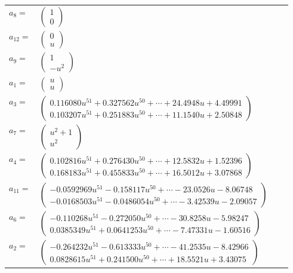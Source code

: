 \documentclass[1p]{elsarticle_modified}
\theoremstyle{definition}
\begin{document}
\begin{tabular}{m{7pt} m{180pt} m{7pt} m{180pt} }
\flushright $a_{8}=$&$\begin{pmatrix}1\\0\end{pmatrix}$ \\
\flushright $a_{12}=$&$\begin{pmatrix}0\\u\end{pmatrix}$ \\
\flushright $a_{9}=$&$\begin{pmatrix}1\\- u^2\end{pmatrix}$ \\
\flushright $a_{1}=$&$\begin{pmatrix}u\\u\end{pmatrix}$ \\
\flushright $a_{3}=$&$\begin{pmatrix}0.116080 u^{51}+0.327562 u^{50}+\cdots+24.4948 u+4.49991\\0.103207 u^{51}+0.251883 u^{50}+\cdots+11.1540 u+2.50848\end{pmatrix}$ \\
\flushright $a_{7}=$&$\begin{pmatrix}u^2+1\\u^2\end{pmatrix}$ \\
\flushright $a_{4}=$&$\begin{pmatrix}0.102816 u^{51}+0.276430 u^{50}+\cdots+12.5832 u+1.52396\\0.168183 u^{51}+0.455833 u^{50}+\cdots+16.5012 u+3.07868\end{pmatrix}$ \\
\flushright $a_{11}=$&$\begin{pmatrix}-0.0592969 u^{51}-0.158117 u^{50}+\cdots-23.0526 u-8.06748\\-0.0168503 u^{51}-0.0486054 u^{50}+\cdots-3.42539 u-2.09057\end{pmatrix}$ \\
\flushright $a_{6}=$&$\begin{pmatrix}-0.110268 u^{51}-0.272050 u^{50}+\cdots-30.8258 u-5.98247\\0.0385349 u^{51}+0.0641253 u^{50}+\cdots-7.47331 u-1.60516\end{pmatrix}$ \\
\flushright $a_{2}=$&$\begin{pmatrix}-0.264232 u^{51}-0.613333 u^{50}+\cdots-41.2535 u-8.42966\\0.0828615 u^{51}+0.241500 u^{50}+\cdots+18.5521 u+3.43075\end{pmatrix}$ \\

\end{tabular}
\end{document}
